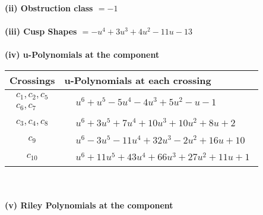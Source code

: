 \documentclass[1p]{elsarticle_modified}
\theoremstyle{definition}
\begin{document}
\flushleft \textbf{(ii) Obstruction class $= -1$}\\~\\
\flushleft \textbf{(iii) Cusp Shapes $= - u^4+3 u^3+4 u^2-11 u-13$}\\~\\
\newpage\renewcommand{\arraystretch}{1}
\flushleft \textbf{(iv) u-Polynomials at the component}\newline \\
\begin{tabular}{m{50pt}|m{274pt}}
Crossings & \hspace{64pt}u-Polynomials at each crossing \\
\hline $$\begin{aligned}c_{1},c_{2},c_{5}\\c_{6},c_{7}\end{aligned}$$&$\begin{aligned}
&u^6+u^5-5 u^4-4 u^3+5 u^2- u-1
\end{aligned}$\\
\hline $$\begin{aligned}c_{3},c_{4},c_{8}\end{aligned}$$&$\begin{aligned}
&u^6+3 u^5+7 u^4+10 u^3+10 u^2+8 u+2
\end{aligned}$\\
\hline $$\begin{aligned}c_{9}\end{aligned}$$&$\begin{aligned}
&u^6-3 u^5-11 u^4+32 u^3-2 u^2+16 u+10
\end{aligned}$\\
\hline $$\begin{aligned}c_{10}\end{aligned}$$&$\begin{aligned}
&u^6+11 u^5+43 u^4+66 u^3+27 u^2+11 u+1
\end{aligned}$\\
\hline
\end{tabular}\\~\\
\newpage\renewcommand{\arraystretch}{1}
\flushleft \textbf{(v) Riley Polynomials at the component}\newline \\
\end{document}

